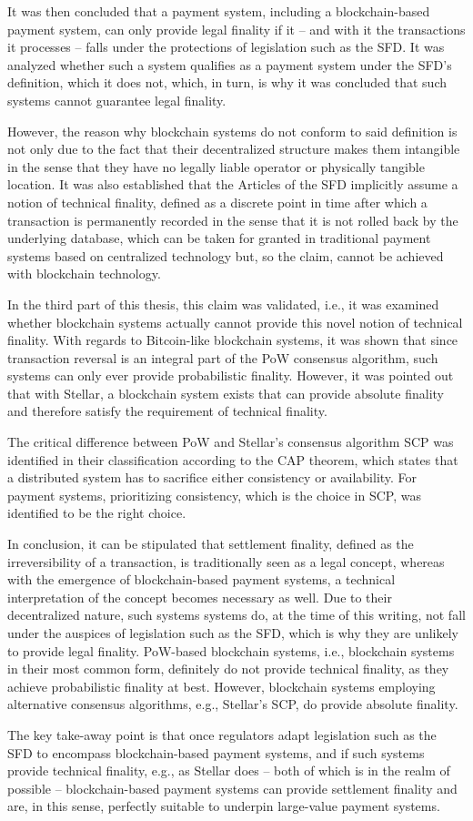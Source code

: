 It was then concluded that a payment system, including a blockchain-based payment system, can only provide legal finality if it -- and with it the transactions it processes -- falls under the protections of legislation such as the SFD.
It was analyzed whether such a system qualifies as a payment system under the SFD's definition, which it does not, which, in turn, is why it was concluded that such systems cannot guarantee legal finality.

However, the reason why blockchain systems do not conform to said definition is not only due to the fact that their decentralized structure makes them intangible in the sense that they have no legally liable operator or physically tangible location.
It was also established that the Articles of the SFD implicitly assume a notion of technical finality, defined as a discrete point in time after which a transaction is permanently recorded in the sense that it is not rolled back by the underlying database, which can be taken for granted in traditional payment systems based on centralized technology but, so the claim, cannot be achieved with blockchain technology.

In the third part of this thesis, this claim was validated, i.e., it was examined whether blockchain systems actually cannot provide this novel notion of technical finality.
With regards to Bitcoin-like blockchain systems, it was shown that since transaction reversal is an integral part of the PoW consensus algorithm, such systems can only ever provide probabilistic finality.
However, it was pointed out that with Stellar, a blockchain system exists that can provide absolute finality and therefore satisfy the requirement of technical finality.

The critical difference between PoW and Stellar's consensus algorithm SCP was identified in their classification according to the CAP theorem, which states that a distributed system has to sacrifice either consistency or availability.
For payment systems, prioritizing consistency, which is the choice in SCP, was identified to be the right choice.

In conclusion, it can be stipulated that settlement finality, defined as the irreversibility of a transaction, is traditionally seen as a legal concept, whereas with the emergence of blockchain-based payment systems, a technical interpretation of the concept becomes necessary as well.
Due to their decentralized nature, such systems systems do, at the time of this writing, not fall under the auspices of legislation such as the SFD, which is why they are unlikely to provide legal finality.
PoW-based blockchain systems, i.e., blockchain systems in their most common form, definitely do not provide technical finality, as they achieve probabilistic finality at best.
However, blockchain systems employing alternative consensus algorithms, e.g., Stellar's SCP, do provide absolute finality.

The key take-away point is that once regulators adapt legislation such as the SFD to encompass blockchain-based payment systems, and if such systems provide technical finality, e.g., as Stellar does -- both of which is in the realm of possible -- blockchain-based payment systems can provide settlement finality and are, in this sense, perfectly suitable to underpin large-value payment systems.
